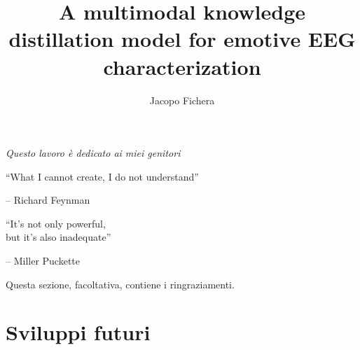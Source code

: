 \documentclass[12pt]{report}
\title{A multimodal knowledge distillation model for emotive EEG characterization}
\author{Jacopo Fichera}
\begin{document}
    \makefrontpage

%
%

    {\raggedleft \large \sl Questo lavoro \`{e} dedicato ai miei genitori\\

    \vspace{2cm}

    ``What I cannot create, I do not understand''

    \bigskip

    \--- Richard Feynman\\

    \vspace{2cm}

    ``It's not only powerful,\\but it's also inadequate''

    \bigskip

    \--- Miller Puckette\\}

    \clearpage
    \beforepreface

%
%


%
%

    Questa sezione, facoltativa, contiene i ringraziamenti.

%
%

    \afterpreface
    
    
    
    
    


    \section{Sviluppi futuri}
\end{document}
